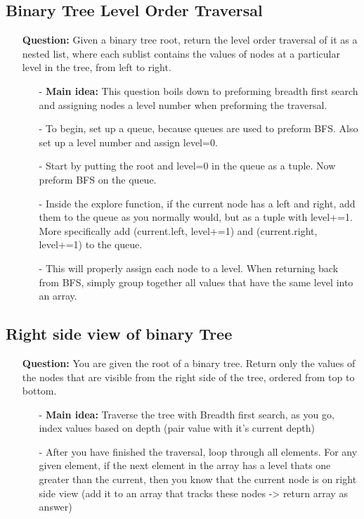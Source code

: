 \documentclass[12pt]{article}
\begin{document}
\subsection{Binary Tree Level Order Traversal}
\begin{enumerate}
  \item[] \textbf{Question:} Given a binary tree root, return the level order traversal of it as a nested list, where each sublist contains the values of nodes at a particular level in the tree, from left to right. 

    \begin{enumerate}
      \item[-] \textbf{Main idea:} This question boils down to preforming breadth first search and assigning nodes a level number when preforming the traversal. 
      \item[-] To begin, set up a queue, because queues are used to preform BFS. Also set up a level number and assign level=0. 
      \item[-] Start by putting the root and level=0 in the queue as a tuple. Now preform BFS on the queue. 
      \item[-] Inside the explore function, if the current node has a left and right, add them to the queue as you normally would, but as a tuple with level+=1. More specifically add (current.left, level+=1) and (current.right, level+=1) to the queue. 
      \item[-] This will properly assign each node to a level. When returning back from BFS, simply group together all values that have the same level into an array. 

    \end{enumerate}
\end{enumerate}

\subsection{Right side view of binary Tree}
\begin{enumerate}
  \item[] \textbf{Question:} You are given the root of a binary tree. Return only the values of the nodes that are visible from the right side of the tree, ordered from top to bottom. 

    \begin{enumerate}
      \item[-] \textbf{Main idea:} Traverse the tree with Breadth first search, as you go, index values based on depth (pair value with it's current depth)
      \item[-] After you have finished the traversal, loop through all elements. For any given element, if the next element in the array has a level thats one greater than the current, then you know that the current node is on right side view (add it to an array that tracks these nodes -> return array as answer)

    \end{enumerate}
\end{enumerate}
\end{document}
